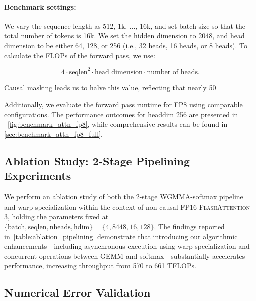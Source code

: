 \begin{itemize}
\paragraph{Benchmark settings:} We vary the sequence length as 512, 1k, ..., 16k, and set batch size so that the total number of tokens is 16k. We set the hidden dimension to 2048, and head dimension to be either 64, 128, or 256 (i.e., 32 heads, 16 heads, or 8 heads). To calculate the FLOPs of the forward pass, we use:

\begin{equation*}
  4 \cdot \text{seqlen}^2 \cdot \text{head dimension} \cdot \text{number of heads}.
\end{equation*}

Causal masking leads us to halve this value, reflecting that nearly 50%

Additionally, we evaluate the forward pass runtime for FP8 using comparable configurations. The performance outcomes for headdim 256 are presented in ~\cref{fig:benchmark_attn_fp8}, while comprehensive results can be found in \cref{sec:benchmark_attn_fp8_full}.

\subsection{Ablation Study: 2-Stage Pipelining Experiments}
\label{sec:2-stage-pipelining-experiments}

We perform an ablation study of both the 2-stage WGMMA-softmax pipeline and warp-specialization within the context of non-causal FP16 \textsc{FlashAttention-3}, holding the parameters fixed at $\{\text{batch}, \text{seqlen}, \text{nheads}, \text{hdim}\} = \{ 4, 8448, 16, 128\}$. The findings reported in~\cref{table:ablation_pipelining} demonstrate that introducing our algorithmic enhancements—including asynchronous execution using warp-specialization and concurrent operations between GEMM and softmax—substantially accelerates performance, increasing throughput from 570 to 661 TFLOPs.

\subsection{Numerical Error Validation}
\label{sec:numerical_error}


\end{itemize}
